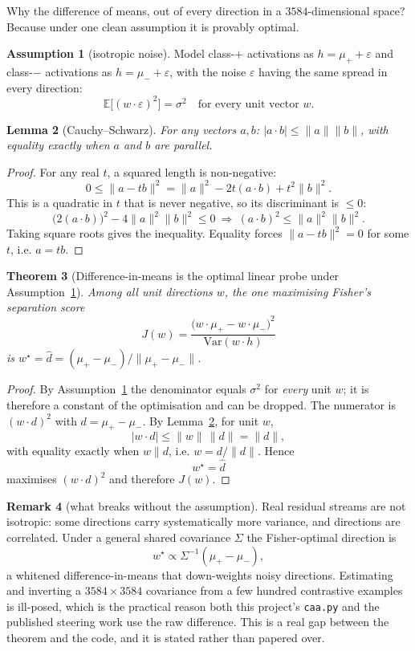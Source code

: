 \documentclass[11pt]{article}
\newtheorem{theorem}{Theorem}
\newtheorem{lemma}[theorem]{Lemma}
\theoremstyle{definition}
\newtheorem{assumption}[theorem]{Assumption}
\newtheorem{remark}[theorem]{Remark}
\begin{document}
Why the difference of means, out of every direction in a $3584$-dimensional space? Because under one clean assumption it is provably optimal.

\begin{assumption}[isotropic noise]
\label{ass:iso}
Model class-$+$ activations as $h = \mu_+ + \varepsilon$ and class-$-$ activations as $h = \mu_- + \varepsilon$, with the noise $\varepsilon$ having the same spread in every direction:
\[
\mathbb{E}\big[(w\cdot\varepsilon)^2\big] = \sigma^2
\quad\text{for every unit vector } w.
\]
\end{assumption}

\begin{lemma}[Cauchy--Schwarz]
\label{lem:cs}
For any vectors $a,b$: $|a\cdot b| \le \|a\|\|b\|$, with equality exactly when $a$ and $b$ are parallel.
\end{lemma}
\begin{proof}
For any real $t$, a squared length is non-negative:
\[
0 \le \|a - tb\|^2 = \|a\|^2 - 2t(a\cdot b) + t^2\|b\|^2 .
\]
This is a quadratic in $t$ that is never negative, so its discriminant is $\le 0$:
\[
\big(2(a\cdot b)\big)^2 - 4\|a\|^2\|b\|^2 \le 0
\ \Longrightarrow\ (a\cdot b)^2 \le \|a\|^2\|b\|^2 .
\]
Taking square roots gives the inequality. Equality forces $\|a-tb\|^2=0$ for some $t$, i.e. $a = tb$.
\end{proof}

\begin{theorem}[Difference-in-means is the optimal linear probe under Assumption~\ref{ass:iso}]
\label{thm:dim}
Among all unit directions $w$, the one maximising Fisher's separation score
\[
J(w) = \frac{\big(w\cdot\mu_+ - w\cdot\mu_-\big)^2}{\mathrm{Var}(w\cdot h)}
\]
is $w^\star = \hat d = (\mu_+-\mu_-)/\|\mu_+-\mu_-\|$.
\end{theorem}

\begin{proof}
By Assumption~\ref{ass:iso} the denominator equals $\sigma^2$ for \emph{every} unit $w$; it is therefore a constant of the optimisation and can be dropped. The numerator is $(w\cdot d)^2$ with $d = \mu_+-\mu_-$. By Lemma~\ref{lem:cs}, for unit $w$,
\[
|w\cdot d| \le \|w\|\,\|d\| = \|d\|,
\]
with equality exactly when $w \parallel d$, i.e. $w = d/\|d\|$. Hence
\[
\boxed{\ w^\star = \hat d\ }
\]
maximises $(w\cdot d)^2$ and therefore $J(w)$.
\end{proof}

\begin{remark}[what breaks without the assumption]
Real residual streams are not isotropic: some directions carry systematically more variance, and directions are correlated. Under a general shared covariance $\Sigma$ the Fisher-optimal direction is
\[
w^\star \propto \Sigma^{-1}(\mu_+-\mu_-),
\]
a whitened difference-in-means that down-weights noisy directions. Estimating and inverting a $3584\times3584$ covariance from a few hundred contrastive examples is ill-posed, which is the practical reason both this project's \texttt{caa.py} and the published steering work use the raw difference. This is a real gap between the theorem and the code, and it is stated rather than papered over.
\end{remark}
\end{document}
